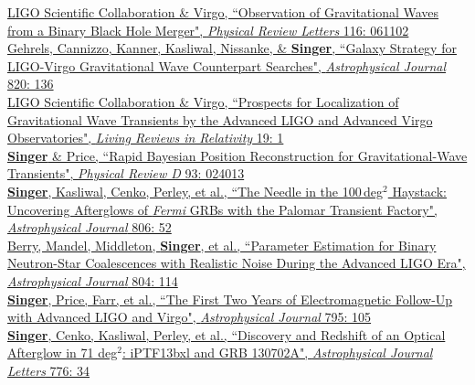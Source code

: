 \documentclass[10pt, letterpaper]{article} %
\newcommand{\years}[1]{\marginnote{\scriptsize #1}} %
\begin{document}
%
%
\years{2016}\href{https://dx.doi.org/10.1103/PhysRevLett.116.061102}{LIGO Scientific Collaboration \& Virgo, “Observation of Gravitational Waves from a Binary Black Hole Merger", \emph{Physical Review Letters} 116: 061102}\\[0.125cm]
% 
\years{2016}\href{https://dx.doi.org/10.3847/0004-637X/820/2/136}{Gehrels, Cannizzo, Kanner, Kasliwal,  Nissanke, \& \textbf{Singer}, “Galaxy Strategy for LIGO-Virgo Gravitational Wave Counterpart Searches", \emph{Astrophysical Journal} 820: 136}\\[0.125cm]
%
\years{2016}\href{https://dx.doi.org/10.1007/lrr-2016-1}{LIGO Scientific Collaboration \& Virgo, “Prospects for Localization of Gravitational Wave Transients by the Advanced LIGO and Advanced Virgo Observatories", \emph{Living Reviews in Relativity} 19: 1}\\[0.125cm]
%
\years{2016}\href{https://dx.doi.org/10.1103/PhysRevD.93.024013}{\textbf{Singer} \& Price, “Rapid Bayesian Position Reconstruction for Gravitational-Wave Transients", \emph{Physical Review D} 93: 024013}\\[0.125cm]
%
%
\years{2015}\href{https://dx.doi.org/10.1088/0004-637X/806/1/52}{\textbf{Singer}, Kasliwal, Cenko, Perley, et al., “The Needle in the 100\,deg$^2$ Haystack: Uncovering Afterglows of \emph{Fermi} GRBs with the Palomar Transient Factory", \emph{Astrophysical Journal} 806: 52}\\[0.125cm]
%
\years{2015}\href{https://dx.doi.org/10.1088/0004-637X/804/2/114}{Berry, Mandel, Middleton, \textbf{Singer}, et al., “Parameter Estimation for Binary Neutron-Star Coalescences with Realistic Noise During the Advanced LIGO Era", \emph{Astrophysical Journal} 804: 114}\\[0.125cm]
%
\years{2014}\href{https://dx.doi.org/10.1088/0004-637X/795/2/105}{\textbf{Singer}, Price, Farr, et al., “The First Two Years of Electromagnetic Follow-Up with Advanced LIGO and Virgo", \emph{Astrophysical Journal} 795: 105}\\[0.125cm]
%
\years{2013}\href{https://dx.doi.org/10.1088/2041-8205/776/2/L34}{\textbf{Singer}, Cenko, Kasliwal, Perley, et al., “Discovery and Redshift of an Optical Afterglow in 71 deg$^2$: iPTF13bxl and GRB 130702A", \emph{Astrophysical Journal Letters} 776: 34}\\[0.125cm]
\end{document}
